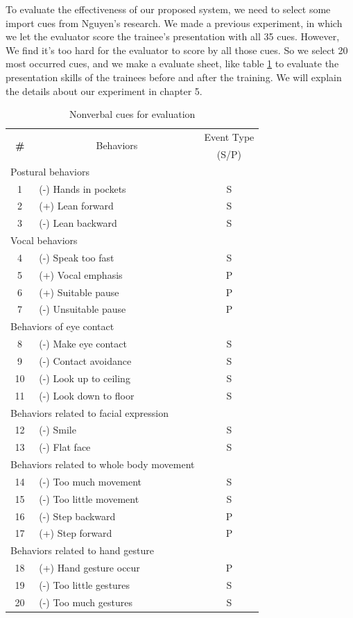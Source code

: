 \par To evaluate the effectiveness of our proposed system, we need to select some import cues from Nguyen's research. We made a previous experiment, in which we let the evaluator score the trainee's presentation with all 35 cues. However, We find it's too hard for the evaluator to score by all those cues. So we select 20 most occurred cues, and we make a evaluate sheet, like table \ref{tab:evalutioncues} to evaluate the presentation skills of the trainees before and after the training. We will explain the details about our experiment in chapter 5.

\begin{table}[]
\centering
\caption{Nonverbal cues for evaluation}
\label{tab:evalutioncues}
\begin{tabular}{clc}
\hline
\multirow{3}{*}{\textbf{\#}} & \multicolumn{1}{c}{\multirow{3}{*}{Behaviors}} & \multirow{2}{*}{Event Type} \\
 & \multicolumn{1}{c}{} &  \\
 & \multicolumn{1}{c}{} & (S/P) \\ \hline
\multicolumn{2}{l}{Postural behaviors} &  \\
1 & (-) Hands in pockets & S \\
2 & (+) Lean forward & S \\
3 & (-) Lean backward & S \\ \hline
\multicolumn{2}{l}{Vocal behaviors} &  \\
4 & (-) Speak too fast & S \\
5 & (+) Vocal emphasis & P \\
6 & (+) Suitable pause & P \\
7 & (-) Unsuitable pause & P \\ \hline
\multicolumn{2}{l}{Behaviors of eye contact} &  \\
8 & (-) Make eye contact & S \\
9 & (-) Contact avoidance & S \\
10 & (-) Look up to ceiling & S \\
11 & (-) Look down to floor & S \\ \hline
\multicolumn{2}{l}{Behaviors related to facial expression} &  \\
12 & (-) Smile & S \\
13 & (-) Flat face & S \\ \hline
\multicolumn{2}{l}{Behaviors related to whole body movement} &  \\
14 & (-) Too much movement & S \\
15 & (-) Too little movement & S \\
16 & (-) Step backward & P \\
17 & (+) Step forward & P \\ \hline
\multicolumn{3}{l}{Behaviors related to hand gesture} \\
18 & (+) Hand gesture occur & P \\
19 & (-) Too little gestures & S \\
20 & (-) Too much gestures & S \\ \hline
\end{tabular}
\end{table}

